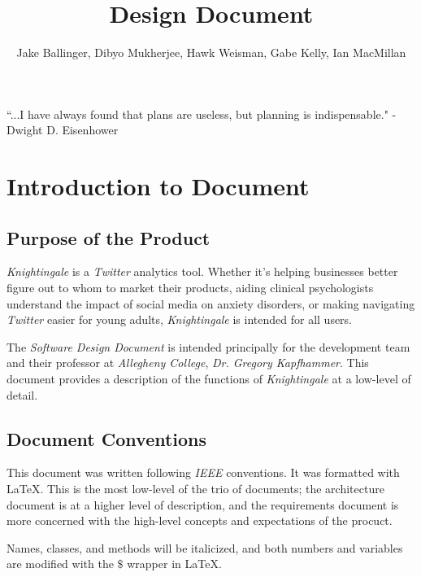 \documentclass[a4paper, 12pt]{article}
\title{Design Document}
\author{Jake Ballinger, Dibyo Mukherjee, Hawk Weisman, Gabe Kelly, Ian MacMillan}
\begin{document}
\maketitle

\begin{center}
\centering  ``...I have always found that plans are useless, but planning is indispensable." \newline
\centering - Dwight D. Eisenhower
\end{center}

\section{Introduction to Document} \label{sec:intro}
\subsection{Purpose of the Product} \label{sec:purpose}
\begin{adjustwidth}{2em}{0pt}
\textit{Knightingale} is a \textit{Twitter} analytics tool. Whether it's helping businesses better figure out to whom to market their products, aiding clinical psychologists understand the impact of social media on anxiety disorders, or making navigating \textit{Twitter} easier for young adults, \textit{Knightingale} is intended for all users. \newline

\noindent The \textit{Software Design Document} is intended principally for the development team and their professor at \textit{Allegheny College}, \textit{Dr. Gregory Kapfhammer}. This document provides a description of the functions of \textit{Knightingale} at a low-level of detail.
\end{adjustwidth}

\subsection{Document Conventions} \label{sec:conventions}
\begin{adjustwidth}{2em}{0pt}
This document was written following \textit{IEEE} conventions. It was formatted with \LaTeX. This is the most low-level of the trio of documents; the architecture document is at a higher level of description, and the requirements document is more concerned with the high-level concepts and expectations of the procuct. \newline

\noindent Names, classes, and methods will be italicized, and both numbers and variables are modified with the $\$$ wrapper in \LaTeX.
\end{adjustwidth}
\end{document}
